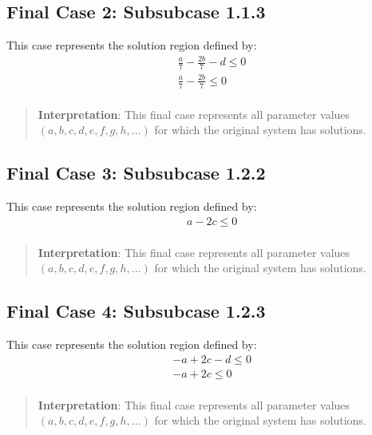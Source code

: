 \documentclass{article}
\newenvironment{stepdetail}
  {\begin{quote}\small\color{blue}}
  {\end{quote}}
\begin{document}
\subsection{Final Case 2: Subsubcase 1.1.3}

This case represents the solution region defined by:
\begin{align}
& \frac{a}{7} - \frac{2 b}{7} - d \leq 0 \\
& \frac{a}{7} - \frac{2 b}{7} \leq 0 \\
\end{align}

\begin{stepdetail}
\textbf{Interpretation}: This final case represents all parameter values
$(a, b, c, d, e, f, g, h, \ldots)$ for which the original system has solutions.
\end{stepdetail}

\subsection{Final Case 3: Subsubcase 1.2.2}

This case represents the solution region defined by:
\begin{align}
& a - 2 c \leq 0 \\
\end{align}

\begin{stepdetail}
\textbf{Interpretation}: This final case represents all parameter values
$(a, b, c, d, e, f, g, h, \ldots)$ for which the original system has solutions.
\end{stepdetail}

\subsection{Final Case 4: Subsubcase 1.2.3}

This case represents the solution region defined by:
\begin{align}
& - a + 2 c - d \leq 0 \\
& - a + 2 c \leq 0 \\
\end{align}

\begin{stepdetail}
\textbf{Interpretation}: This final case represents all parameter values
$(a, b, c, d, e, f, g, h, \ldots)$ for which the original system has solutions.
\end{stepdetail}
\end{document}
